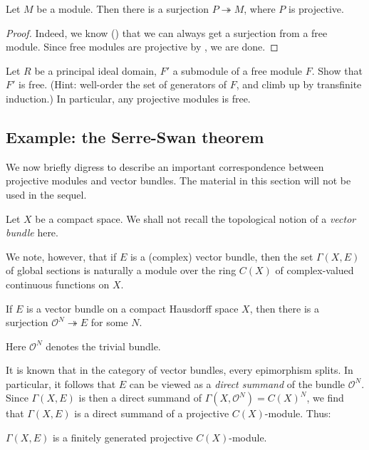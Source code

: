 \begin{corollary}
Let $M$ be a module. Then there is a surjection $P \twoheadrightarrow M$,
where $P$ is projective.
\end{corollary}
\begin{proof}
Indeed, we know () that we can always get a surjection
from a free
module. Since free modules are projective by , we are
done.
\end{proof}

\begin{exercise}
Let $R$ be a principal ideal domain, $F'$ a submodule of a free module
$F$. Show that
$F'$ is free. (Hint: well-order the set of generators of $F$, and climb up by
transfinite induction.)
In particular, any projective modules is free.
\end{exercise}

\subsection{Example: the Serre-Swan theorem}

We now briefly digress to describe an important correspondence between
projective modules and vector bundles. The material in this section will not
be used in the sequel.

Let $X$ be a compact space. We shall not recall the topological notion of a
\emph{vector bundle} here. 

We note, however, that if $E$ is a (complex) vector bundle,
then the set $\Gamma(X, E)$ of global sections is naturally a module over the
ring $C(X)$ of complex-valued continuous functions on $X$.

\begin{proposition} 
If $E$ is a vector bundle on a compact Hausdorff space $X$, then there is a
surjection $\mathcal{O}^N \twoheadrightarrow E$ for some $N$.
\end{proposition} 
Here $\mathcal{O}^N$ denotes the trivial bundle.

It is known that in the category of vector bundles, every epimorphism splits. 
In particular, it follows that $E$ can be viewed as a \emph{direct summand} of
the bundle $\mathcal{O}^N$. Since $\Gamma(X, E)$ is then a direct summand of
$\Gamma(X, \mathcal{O}^N) = C(X)^N$, we find that $\Gamma(X, E)$ is a direct
summand of a projective $C(X)$-module. Thus:

\begin{proposition} 
$\Gamma(X, E)$ is a finitely generated projective $C(X)$-module.
\end{proposition} 

